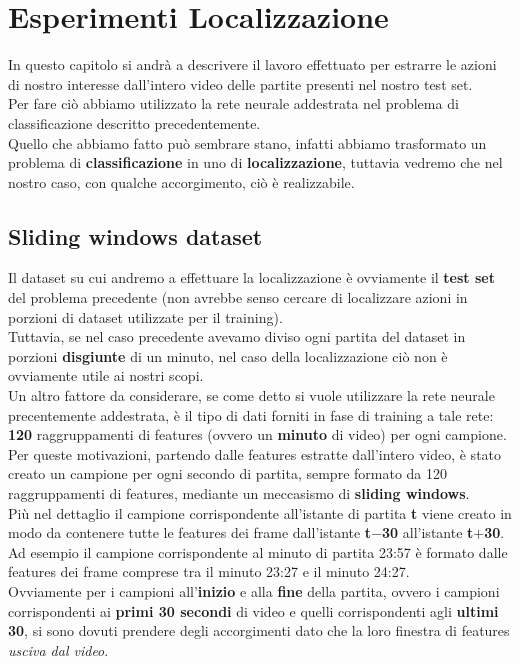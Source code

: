 \chapter{Esperimenti Localizzazione}\label{ch:chapter3}
In questo capitolo si andrà a descrivere il lavoro effettuato per estrarre le azioni di nostro interesse dall'intero video delle partite presenti nel nostro test set.
\\Per fare ciò abbiamo utilizzato la rete neurale addestrata nel problema di classificazione descritto precedentemente.
\\Quello che abbiamo fatto  può sembrare stano, infatti abbiamo trasformato un problema di \textbf{classificazione} in uno di \textbf{localizzazione}, tuttavia vedremo che nel nostro caso, con qualche accorgimento, ciò è realizzabile.
\section{Sliding windows dataset}
Il dataset su cui andremo a effettuare la localizzazione è ovviamente il \textbf{test set} del problema precedente (non avrebbe senso cercare di localizzare azioni in porzioni di dataset utilizzate per il training).
\\Tuttavia, se nel caso precedente avevamo diviso ogni partita del dataset in porzioni \textbf{disgiunte} di un minuto, nel caso della localizzazione ciò non è ovviamente utile ai nostri scopi.
\\Un altro fattore da considerare, se come detto si vuole utilizzare la rete neurale precentemente addestrata, è  il tipo di dati forniti in fase di training a tale rete: \textbf{120} raggruppamenti di features (ovvero un \textbf{minuto} di video) per ogni campione.
\\Per queste motivazioni, partendo dalle features estratte dall'intero video, è stato creato un campione per ogni secondo di partita, sempre formato da 120 raggruppamenti di features, mediante un meccasismo di \textbf{sliding windows}.
\\Più nel dettaglio il campione corrispondente all'istante di partita \textbf{t} viene creato in modo da contenere tutte le features dei frame dall'istante \textbf{t$-$30} all'istante \textbf{t$+$30}.
\\Ad esempio il campione corrispondente al minuto di partita 23:57 è formato dalle features dei frame comprese tra il minuto 23:27 e il minuto  24:27.
\\Ovviamente per i campioni all'\textbf{inizio} e alla \textbf{fine} della partita, ovvero i campioni corrispondenti ai \textbf{primi 30 secondi} di video e quelli corrispondenti agli \textbf{ultimi 30}, si sono dovuti prendere degli accorgimenti dato che la loro finestra di features \textit{usciva dal video}.
